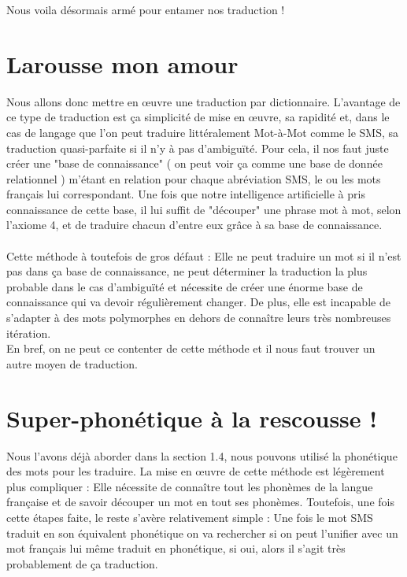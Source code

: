 \documentclass[11pt]{book}
\begin{document}
	Nous voila désormais armé pour entamer nos traduction !
	
	\section{Larousse mon amour}
	Nous allons donc mettre en œuvre une traduction par dictionnaire. L'avantage de ce type de traduction est ça simplicité de mise en œuvre, sa rapidité et, dans le cas de langage que l'on peut traduire littéralement Mot-à-Mot comme le SMS, sa traduction quasi-parfaite si il n'y à pas d'ambiguïté. Pour cela, il nos faut juste créer une "base de connaissance" ( on peut voir ça comme une base de donnée relationnel ) m'étant en relation pour chaque abréviation SMS, le ou les mots français lui correspondant. Une fois que notre intelligence artificielle à pris connaissance de cette base, il lui suffit de "découper" une phrase mot à mot, selon l'axiome 4, et de traduire chacun d'entre eux grâce à sa base de connaissance.
	\paragraph{}
	Cette méthode à toutefois de gros défaut : Elle ne peut traduire un mot si il n'est pas dans ça base de connaissance, ne peut déterminer la traduction la plus probable dans le cas d'ambiguïté et nécessite de créer une énorme base de connaissance qui va devoir régulièrement changer. De plus, elle est incapable de s'adapter à des mots polymorphes en dehors de connaître leurs très nombreuses itération.\\
	En bref, on ne peut ce contenter de cette méthode et il nous faut trouver un autre moyen de traduction.
	
	\section{Super-phonétique à la rescousse !}
	Nous l'avons déjà aborder dans la section 1.4, nous pouvons utilisé la phonétique des mots pour les traduire.
	La mise en œuvre de cette méthode est légèrement plus compliquer : Elle nécessite de connaître tout les phonèmes de la langue française et de savoir découper un mot en tout ses phonèmes. Toutefois, une fois cette étapes faite, le reste s'avère relativement simple : Une fois le mot SMS traduit en son équivalent phonétique on va rechercher si on peut l'unifier avec un mot français lui même traduit en phonétique, si oui, alors il s'agit très probablement de ça traduction.
\end{document}
